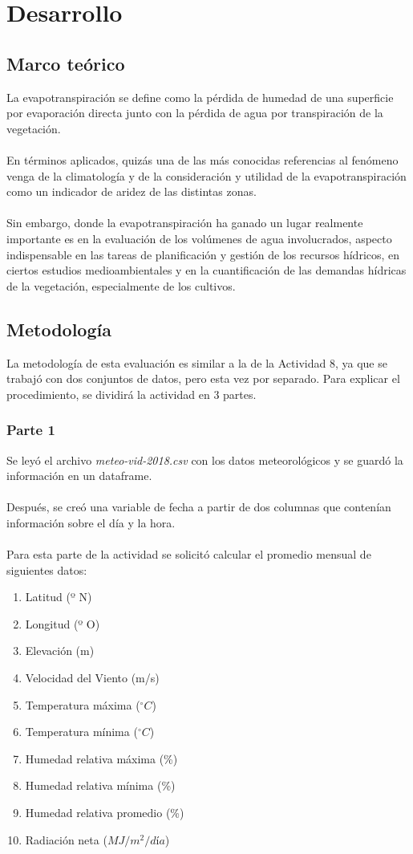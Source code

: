 \documentclass[letterpaper,12pt]{article}
\begin{document}
\section{Desarrollo}
\subsection{Marco teórico}
La evapotranspiración se define como la pérdida de humedad de una superficie por evaporación directa junto con la pérdida de agua por transpiración de la vegetación.\\\\
En términos aplicados, quizás una de las más conocidas referencias al fenómeno venga de la climatología y de la consideración y utilidad de la evapotranspiración como un indicador de aridez de las distintas zonas.\\\\
Sin embargo, donde la evapotranspiración ha ganado un lugar realmente importante es en la evaluación de los volúmenes de agua involucrados, aspecto indispensable en las tareas de planificación y gestión de los recursos hídricos, en ciertos estudios medioambientales y en la cuantificación de las demandas hídricas de la vegetación, especialmente de los cultivos. 


\subsection{Metodología} 
La metodología de esta evaluación es similar a la de la Actividad 8, ya que se trabajó con dos conjuntos de datos, pero esta vez por separado. Para explicar el procedimiento, se dividirá la actividad en 3 partes.

\subsubsection{Parte 1}
Se leyó el archivo \emph{meteo-vid-2018.csv} con los datos meteorológicos y se guardó la información en un dataframe.\\\\
Después, se creó una variable de fecha a partir de dos columnas que contenían información sobre el día y la hora.\\\\
Para esta parte de la actividad se solicitó calcular el promedio mensual de siguientes datos:

\begin{enumerate}
    \item Latitud (º N) 
    \item Longitud (º O)
    \item Elevación (m)
    \item Velocidad del Viento (m/s)
    \item Temperatura máxima ($^{\circ}C$)
    \item Temperatura mínima ($^{\circ}C$)
    \item Humedad relativa máxima (\%)
    \item Humedad relativa mínima (\%)
    \item Humedad relativa promedio (\%)
    \item Radiación neta ($MJ/m^{2}/día$)
\end{enumerate}
\end{document}
